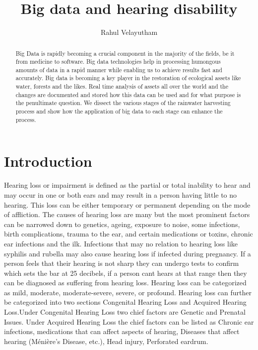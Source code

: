 \documentclass[sigconf]{acmart}
\begin{document}
\title{Big data and hearing disability}


\author{Rahul Velayutham}

\renewcommand{\shortauthors}{R. Velayutham}


\begin{abstract}
Big Data is rapidly becoming a crucial component in the majority of the fields, be it from medicine to software. Big data technologies help in processing humongous amounts of data in a rapid manner while enabling us to achieve results fast and accurately. Big data is becoming a key player in the restoration of ecological assets like water, forests and the likes. Real time analysis of assets all over the world and the changes are documented and stored how this data can be used and for what purpose is the penultimate question. We dissect the various stages of the rainwater harvesting process and show how the application of big data to each stage can enhance the process.
\end{abstract}



\maketitle



\section{Introduction}

Hearing loss or impairment is defined as the partial or total inability to hear and may occur in one or both ears and may result in a person having little to no hearing. This loss can be either temporary or permanent depending on the mode of affliction. The causes of hearing loss are many but the most prominent factors can be narrowed down to genetics, ageing, exposure to noise, some infections, birth complications, trauma to the ear, and certain medications or toxins, chronic ear infections and the ilk. Infections that may no relation to hearing loss like syphilis and rubella may also cause hearing loss if infected during pregnancy. If a person feels that their hearing is not sharp they can undergo tests to confirm which sets the bar at 25 decibels, if a person cant hears at that range then they can be diagnosed as suffering from hearing loss. Hearing loss can be categorized as mild, moderate, moderate-severe, severe, or profound\cite{Wikipedia2017}. Hearing loss can further be categorized into two sections Congenital Hearing Loss and Acquired Hearing Loss.Under Congenital Hearing Loss two chief factors are Genetic and Prenatal Issues. Under Acquired Hearing Loss the chief factors can be listed as Chronic ear infections, medications that can affect aspects of hearing, Diseases that affect hearing (Ménière's Disease, etc.), Head injury, Perforated eardrum\cite{Academy2017}.
\end{document}
